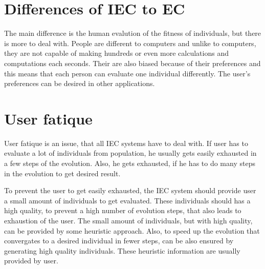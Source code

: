 \section{Differences of IEC to EC}
The main difference is the human evalution of the fitness of individuals, but there is more to deal with. People are different to computers and unlike to computers, they are not capable of making hundreds or even more calculations and computations each seconds. Their are also biased because of their preferences and this means that each person can evaluate one individual differently. The user's preferences can be desired in other applications.
\section{User fatique}
User fatique is an issue, that all IEC systems have to deal with. If user has to evaluate a lot of individuals from population, he usually gets easily exhausted in a few steps of the evolution. Also, he gets exhausted, if he has to do many steps in the evolution to get desired result.

To prevent the user to get easily exhausted, the IEC system should provide user a small amount of individuals to get evaluated. These individuals should has a high quality, to prevent a high number of evolution steps, that also leads to exhaustion of the user. The small amount of individuals, but with high quality, can be provided by some heuristic approach. Also, to speed up the evolution that convergates to a desired individual in fewer steps, can be also ensured by generating high quality individuals. These heuristic information are usually provided by user.
